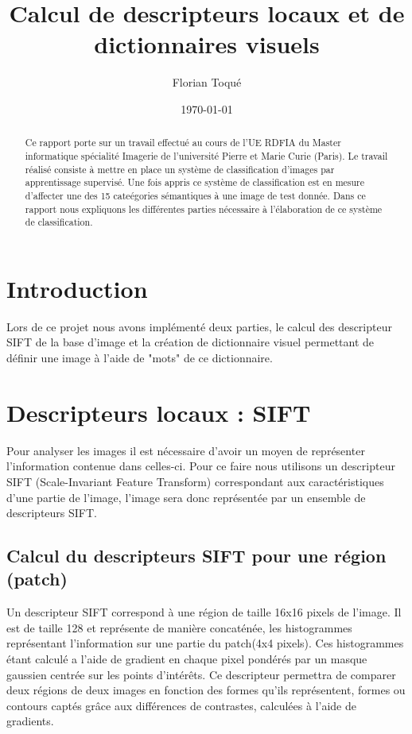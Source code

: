 \documentclass[a4paper]{article}
\title{Calcul de descripteurs locaux et de dictionnaires visuels}
\author{Florian Toqué}
\date{\today}
\begin{document}
\maketitle

\begin{abstract}

Ce rapport porte sur un travail effectué au cours de l'UE RDFIA du Master informatique spécialité Imagerie de l'université Pierre et Marie Curie (Paris). Le travail réalisé consiste à mettre en place un système de classification d’images par apprentissage supervisé. Une fois appris ce système de classification est en mesure d’affecter une des 15 cateégories sémantiques à une image de test donnée. Dans ce rapport nous expliquons  les différentes parties nécessaire à l'élaboration de ce système de classification. 
\end{abstract}

\section{Introduction}
Lors de ce projet nous avons implémenté deux parties, le calcul des descripteur SIFT de la base d'image et la création de dictionnaire visuel permettant de définir une image à l'aide de "mots" de ce dictionnaire.


\section{Descripteurs locaux : SIFT }
Pour analyser les images il est nécessaire d'avoir un moyen de représenter l'information contenue dans celles-ci. Pour ce faire nous utilisons un descripteur SIFT (Scale-Invariant Feature Transform)  correspondant aux caractéristiques d'une partie de l'image, l'image sera donc représentée par un ensemble de descripteurs SIFT. 
\subsection{Calcul du descripteurs SIFT pour une région (patch)}
Un descripteur SIFT correspond à une région de taille 16x16 pixels de l'image. Il est de taille 128 et représente de manière concaténée, les histogrammes représentant l'information sur une partie du patch(4x4 pixels). Ces histogrammes étant calculé a l'aide de gradient en chaque pixel pondérés par un masque gaussien centrée sur les points d'intérêts. Ce descripteur permettra de comparer deux régions de deux images en fonction des formes qu'ils représentent, formes ou contours captés grâce aux différences de contrastes, calculées à l'aide de gradients.\\
\end{document}
